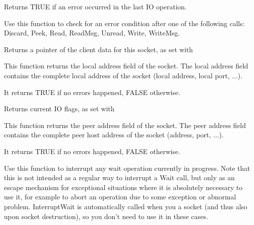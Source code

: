 %
%
\label{wxsocketbaseerror}


Returns TRUE if an error occurred in the last IO operation.

Use this function to check for an error condition after one of the
following calls: Discard, Peek, Read, ReadMsg, Unread, Write, WriteMsg.

%
%
\label{wxsocketbasegetclientdata}


Returns a pointer of the client data for this socket, as set with 

%
%
\label{wxsocketbasegetlocal}


This function returns the local address field of the socket. The local
address field contains the complete local address of the socket (local
address, local port, ...).


It returns TRUE if no errors happened, FALSE otherwise.

%
%
\label{wxsocketbasegetflags}


Returns current IO flags, as set with 

%
%
\label{wxsocketbasegetpeer}


This function returns the peer address field of the socket. The peer 
address field contains the complete peer host address of the socket
(address, port, ...).


It returns TRUE if no errors happened, FALSE otherwise.

%
%
\label{wxsocketbaseinterruptwait}


Use this function to interrupt any wait operation currently in progress.
Note that this is not intended as a regular way to interrupt a Wait call,
but only as an escape mechanism for exceptional situations where it is
absolutely necessary to use it, for example to abort an operation due to
some exception or abnormal problem. InterruptWait is automatically called
when you  a socket (and thus also upon
socket destruction), so you don't need to use it in these cases.

